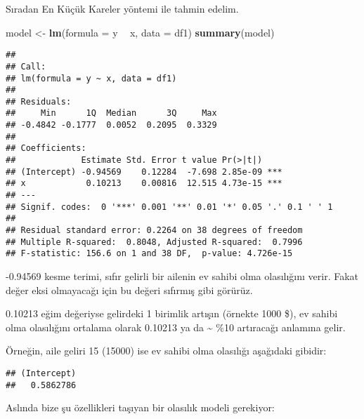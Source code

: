 \documentclass[
]{book}
\newenvironment{Shaded}{\begin{snugshade}}{\end{snugshade}}
\newcommand{\DataTypeTok}[1]{\textcolor[rgb]{0.13,0.29,0.53}{#1}}
\newcommand{\DecValTok}[1]{\textcolor[rgb]{0.00,0.00,0.81}{#1}}
\newcommand{\KeywordTok}[1]{\textcolor[rgb]{0.13,0.29,0.53}{\textbf{#1}}}
\newcommand{\NormalTok}[1]{#1}
\newcommand{\OperatorTok}[1]{\textcolor[rgb]{0.81,0.36,0.00}{\textbf{#1}}}
\newcommand{\StringTok}[1]{\textcolor[rgb]{0.31,0.60,0.02}{#1}}
\begin{document}
Sıradan En Küçük Kareler yöntemi ile tahmin edelim.

\begin{Shaded}
\begin{Highlighting}[]
\NormalTok{model <-}\StringTok{ }\KeywordTok{lm}\NormalTok{(}\DataTypeTok{formula =}\NormalTok{ y }\OperatorTok{~}\StringTok{ }\NormalTok{x, }\DataTypeTok{data =}\NormalTok{ df1)}
\KeywordTok{summary}\NormalTok{(model)}
\end{Highlighting}
\end{Shaded}

\begin{verbatim}
## 
## Call:
## lm(formula = y ~ x, data = df1)
## 
## Residuals:
##     Min      1Q  Median      3Q     Max 
## -0.4842 -0.1777  0.0052  0.2095  0.3329 
## 
## Coefficients:
##             Estimate Std. Error t value Pr(>|t|)    
## (Intercept) -0.94569    0.12284  -7.698 2.85e-09 ***
## x            0.10213    0.00816  12.515 4.73e-15 ***
## ---
## Signif. codes:  0 '***' 0.001 '**' 0.01 '*' 0.05 '.' 0.1 ' ' 1
## 
## Residual standard error: 0.2264 on 38 degrees of freedom
## Multiple R-squared:  0.8048, Adjusted R-squared:  0.7996 
## F-statistic: 156.6 on 1 and 38 DF,  p-value: 4.726e-15
\end{verbatim}

-0.94569 kesme terimi, sıfır gelirli bir ailenin ev sahibi olma olasılığını verir. Fakat değer eksi olmayacağı için bu değeri sıfırmış gibi görürüz.

0.10213 eğim değeriyse gelirdeki 1 birimlik artışın (örnekte 1000 \$), ev sahibi olma olasılığını ortalama olarak 0.10213 ya da \textasciitilde{} \%10 artıracağı anlamına gelir.

Örneğin, aile geliri 15 (15000) ise ev sahibi olma olasılığı aşağıdaki gibidir:

\begin{Shaded}
\end{Shaded}

\begin{verbatim}
## (Intercept) 
##   0.5862786
\end{verbatim}

Aslında bize şu özellikleri taşıyan bir olasılık modeli gerekiyor:
\end{document}

